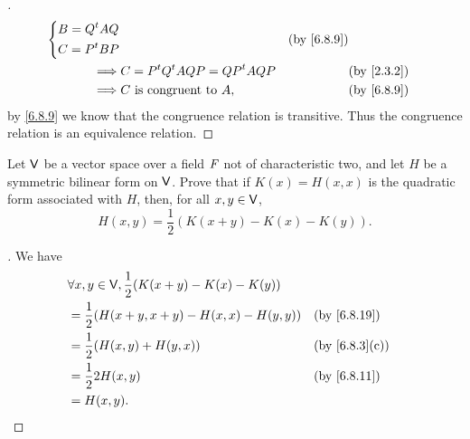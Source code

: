 \begin{proof}[]
\begin{align*}
\begin{dcases}
                                                  B = \tp{Q} A Q              \\
                                                  C = \tp{P} B P
                                                \end{dcases} &  & \by{6.8.9}   \\
    \implies & C = \tp{P} \tp{Q} A Q P = \tp{QP} A QP          &  & \by{2.3.2} \\
    \implies & C \text{ is congruent to } A,                   &  & \by{6.8.9}
  \end{align*}
  by \cref{6.8.9} we know that the congruence relation is transitive.
  Thus the congruence relation is an equivalence relation.
\end{proof}

\begin{ex}\label{ex:6.8.13}
\end{ex}

\begin{ex}\label{ex:6.8.16}
  Let \(\mathsf{V}\) be a vector space over a field \(\mathit{F}\) not of characteristic two, and let \(H\) be a symmetric bilinear form on \(\mathsf{V}\).
  Prove that if \(K(x) = H(x, x)\) is the quadratic form associated with \(H\), then, for all \(x, y \in \mathsf{V}\),
  \[
    H(x, y) = \dfrac{1}{2} (K(x + y) - K(x) - K(y)).
  \]
\end{ex}

\begin{proof}[]
  We have
  \begin{align*}
     & \forall x, y \in \V, \dfrac{1}{2} (K(x + y) - K(x) - K(y))                    \\
     & = \dfrac{1}{2} (H(x + y, x + y) - H(x, x) - H(y, y))       &  & \by{6.8.19}   \\
     & = \dfrac{1}{2} (H(x, y) + H(y, x))                         &  & \by{6.8.3}[c] \\
     & = \dfrac{1}{2} 2 H(x, y)                                   &  & \by{6.8.11}   \\
     & = H(x, y).
  \end{align*}
\end{proof}

\begin{ex}\label{ex:6.8.21}
\end{ex}

\begin{ex}\label{ex:6.8.23}
\end{ex}
